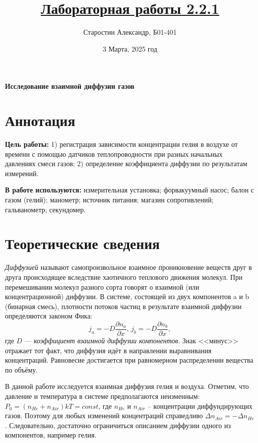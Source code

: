 \documentclass[a4paper]{article}
\title{\underline{Лабораторная работы 2.2.1}}
\author{Старостин Александр, Б01-401}
\date {3 Марта, 2025 год}
\begin{document}
\maketitle
\newpage

\textbf{Исследование взаимной диффузии газов}

\section{Аннотация}
    \par \textbf{Цель работы:} 1) регистрация зависимости концентрации гелия в воздухе от времени с помощью датчиков теплопроводности при разных начальных давлениях смеси газов; 2) определение коэффициента диффузии по результатам измерений. \\

    \par \textbf{В работе используются:}  измерительная установка; форвакуумный насос; балон с газом  (гелий); манометр; источник питания; магазин сопротивлений; гальванометр; секундомер.

\section{Теоретические сведения}

    \textit{Диффузией}  называют самопроизвольное взаимное проникновение веществ друг в друга происходящее вследствие хаотичного теплового движения молекул. При перемешивании молекул разного сорта говорят о взаимной (или концентрационной) диффузии. В системе, состоящей из двух компонентов a и b (бинарная смесь), плотности потоков частиц в результате взаимной диффузии определяются законом Фика:
    \begin{equation}
        j_a = -D \frac{\partial n_a}{\partial x}, \, j_b = -D \frac{\partial n_b}{\partial x},
    \end{equation}
    где $D$ — \textit{коэффициент взаимной диффузии компонентов}. Знак <<минус>> отражает тот факт, что диффузия идёт в направлении выравнивания концентраций. Равновесие достигается при равномерном распределении вещества по объёму.

    В данной работе исследуется взаимная диффузия гелия и воздуха. Отметим, что давление и температура в системе предполагаются неизменным: $P_0 = (n_{He}+n_{Air})kT = const$, где $n_{He}$  и $n_{Air}$ -- концентрации диффундирующих газов. Поэтому для любых изменений концентраций справедливо $\Delta n_{Air} = -\Delta n_{He}$. Следовательно, достаточно ограничиться описанием диффузии одного из компонентов, например гелия.
\end{document}
